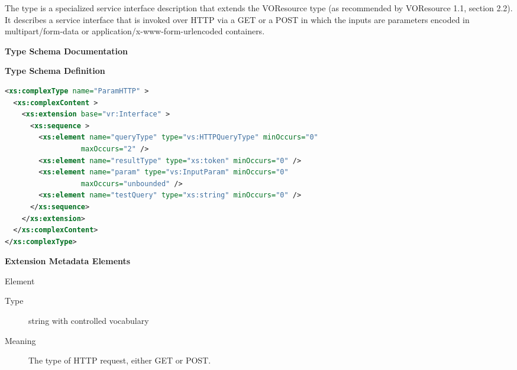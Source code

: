 \documentclass[11pt,a4paper]{ivoa}
\begin{document}
The  type is a specialized service interface
description that extends the VOResource  type
(as recommended by VOResource 1.1, section 2.2).  It
describes a service interface that is invoked over HTTP via a GET or a
POST in which the inputs are parameters
encoded in multipart/form-data or application/x-www-form-urlencoded
containers.

\begin{generated}
\begingroup
        \renewcommand*\descriptionlabel[1]{%
        \hbox to 5.5em{\emph{#1}\hfil}}\vspace{2ex}\noindent\textbf{ Type Schema Documentation}



\vspace{1ex}\noindent\textbf{ Type Schema Definition}

\begin{lstlisting}[language=XML,basicstyle=\footnotesize]
<xs:complexType name="ParamHTTP" >
  <xs:complexContent >
    <xs:extension base="vr:Interface" >
      <xs:sequence >
        <xs:element name="queryType" type="vs:HTTPQueryType" minOccurs="0"
                  maxOccurs="2" />
        <xs:element name="resultType" type="xs:token" minOccurs="0" />
        <xs:element name="param" type="vs:InputParam" minOccurs="0"
                  maxOccurs="unbounded" />
        <xs:element name="testQuery" type="xs:string" minOccurs="0" />
      </xs:sequence>
    </xs:extension>
  </xs:complexContent>
</xs:complexType>
\end{lstlisting}

\vspace{0.5ex}\noindent\textbf{ Extension Metadata Elements}

\begingroup\small\begin{bigdescription}\item[Element \xmlel{queryType}]
\begin{description}
\item[Type] string with controlled vocabulary
\item[Meaning]
                       The type of HTTP request, either GET or POST.


\end{description}
\end{bigdescription}
\end{generated}
\end{document}
